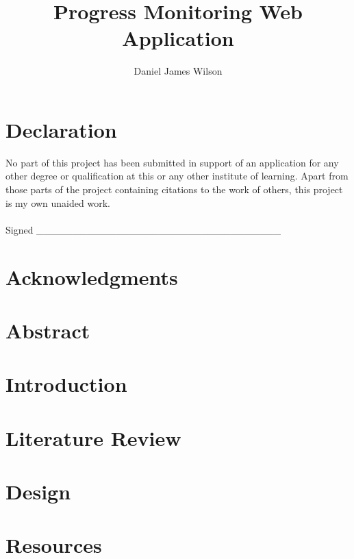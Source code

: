 \documentclass[titlepage,a4paper,11pt,oneside]{book} %
\author{Daniel James Wilson}
\title{Progress Monitoring Web Application}
\date{\parbox{\linewidth}{\centering%
  \today\endgraf\bigskip
    Mobile and Web Application Development \endgraf\bigskip
  Supervisor:\\
  Dr Moi Hoon Yap\endgraf\bigskip
  Manchester Metropolitan University}}
\begin{document}
\frontmatter %
\maketitle

\chapter*{Declaration}
No part of this project has been submitted in support of an application for any other degree or qualification at this or any other institute of learning. Apart from those parts of the project containing citations to the work of others, this project is my own unaided work.\\ \\

Signed \_\_\_\_\_\_\_\_\_\_\_\_\_\_\_\_\_\_\_\_\_\_\_\_\_\_\_\_\_\_\_\_\_\_

\chapter{Acknowledgments}


\chapter{Abstract}


\tableofcontents

\pagebreak
{}
\listoffigures
\pagebreak

\printnomenclature[2cm]

\mainmatter %
\chapter{Introduction}
\label{sec:mainIntro}


\chapter{Literature Review}
\label{sec:litrev}


\chapter{Design}
\label{sec:design}


\chapter{Resources}
\label{sec:resources}

\end{document}
